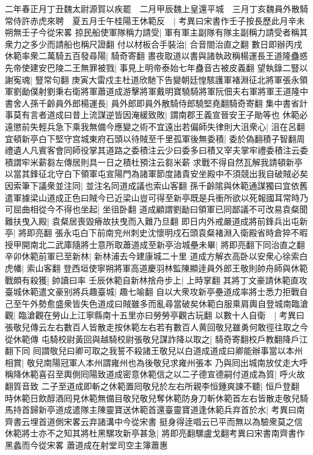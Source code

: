 二年春正月丁丑魏太尉源賀以疾罷　二月甲辰魏上皇還平城　三月丁亥魏員外散騎常侍許赤虎來聘　夏五月壬午桂陽王休範反　|{
	考異曰宋書作壬子按長歷此月辛未朔無壬子今從宋畧}
掠民船使軍隊稱力請受|{
	軍有軍主副隊有隊主副稱力請受者稱其衆力之多少而請船也稱尺證翻}
付以材板合手裝治|{
	合音閤治直之翻}
數日即辦丙戌休範率衆二萬騎五百發尋陽|{
	騎奇寄翻}
晝夜取道以書與諸執政稱楊運長王道隆蠱惑先帝使建安巴陵二王無罪被戮|{
	事見上明帝泰始七年蠱音古被皮義翻}
望執錄二豎以謝寃魂|{
	豎常句翻}
庚寅大雷戍主杜道欣馳下告變朝廷惶駭護軍褚淵征北將軍張永領軍劉勔僕射劉秉右衛將軍蕭道成游擊將軍戴明寶驍騎將軍阮佃夫右軍將軍王道隆中書舍人孫千齡員外郎楊運長|{
	員外郎即員外散騎侍郎驍堅堯翻騎奇寄翻}
集中書省計事莫有言者道成曰昔上流謀逆皆因淹緩致敗|{
	謂南郡王義宣晉安王子勛等也}
休範必遠懲前失輕兵急下乘我無備今應變之術不宜遠出若偏師失律則大沮衆心|{
	沮在呂翻}
宜頓新亭白下堅守宫城東府石頭以待賊至千里孤軍後無委積|{
	委於偽翻積子智翻周禮遺人凡賓客會同師役掌其道路之委積注云少曰委多曰積又宰夫掌牢禮委積注云委積謂牢米薪芻左傳居則具一日之積杜預注云芻米薪}
求戰不得自然瓦解我請頓新亭以當其鋒征北守白下領軍屯宣陽門為諸軍節度諸貴安坐殿中不須競出我自破賊必矣因索筆下議衆並注同|{
	並注名同道成議也索山客翻}
孫千齡隂與休範通謀獨曰宜依舊遣軍據梁山道成正色曰賊今已近梁山豈可得至新亭既是兵衝所欲以死報國耳常時乃可屈曲相從今不得也坐起|{
	坐徂卧翻}
道成顧謂劉勔曰領軍已同鄙議不可改易袁粲聞難扶曳入殿|{
	袁粲居喪毀瘠故扶曳而入難乃旦翻}
即日内外戒嚴道成將前鋒兵出屯新亭|{
	將即亮翻}
張永屯白下前南兖州刺史沈懷明戍石頭袁粲褚淵入衛殿省時倉猝不暇授甲開南北二武庫隨將士意所取蕭道成至新亭治城壘未畢|{
	將即亮翻下同治直之翻}
辛卯休範前軍已至新林|{
	新林浦去今建康城二十里}
道成方解衣高卧以安衆心徐索白虎幡|{
	索山客翻}
登西垣使寧朔將軍高道慶羽林監陳顯逹員外郎王敬則帥舟師與休範戰頗有殺獲|{
	帥讀曰率}
壬辰休範自新林捨舟步上|{
	上時掌翻}
其將丁文豪請休範直攻臺城休範遣文豪别將兵趣臺城|{
	趣七喻翻}
自以大衆攻新亭壘道成率將士悉力拒戰自己至午外勢愈盛衆皆失色道成曰賊雖多而亂尋當破矣休範白服乘肩輿自登城南臨滄觀|{
	臨滄觀在勞山上江寧縣南十五里亦曰勞勞亭觀古玩翻}
以數十人自衛　|{
	考異曰張敬兒傳云左右數百人皆散走按休範左右若有數百人黄回敬兒雖勇何敢徑往取之今從休範傳}
屯騎校尉黃回與越騎校尉張敬兒謀詐降以取之|{
	騎奇寄翻校戶教翻降戶江翻下同}
囘謂敬兒曰卿可取之我誓不殺諸王敬兒以白道成道成曰卿能辦事當以本州相賞|{
	敬兒南陽冠軍人本州謂雍州也為後敬兒求雍州張本}
乃與囘出城南放仗走大呼稱降休範喜召至輿側囘陽致道成密意休範信之以二子德宣德嗣付道成為質|{
	呼火故翻質音致}
二子至道成即斬之休範置囘敬兒於左右所親李恒鍾爽諫不聽|{
	恒戶登翻}
時休範日飲醇酒囘見休範無備目敬兒敬兒奪休範防身刀斬休範首左右皆散走敬兒騎馬持首歸新亭道成遣隊主陳靈寶送休範首還臺靈寶道逢休範兵弃首於水|{
	考異曰南齊書云埋首道側宋畧云弃諸溝中今從宋書}
挺身得逹唱云已平而無以為驗衆莫之信休範將士亦不之知其將杜黑騾攻新亭甚急|{
	將即亮翻騾盧戈翻考異曰宋書南齊書作黑蠡而今從宋畧}
蕭道成在射堂司空主簿蕭惠

